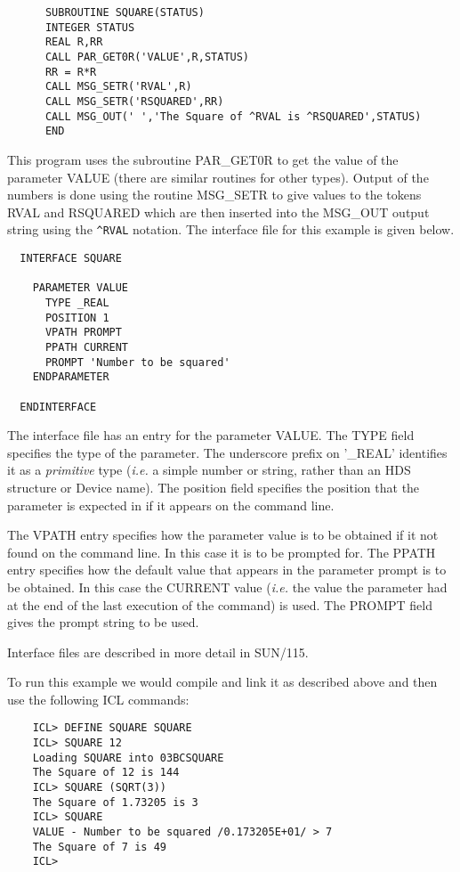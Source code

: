 \documentclass[twoside,11pt]{report}
\begin{document}
\begin{verbatim}
      SUBROUTINE SQUARE(STATUS)
      INTEGER STATUS
      REAL R,RR
      CALL PAR_GET0R('VALUE',R,STATUS)
      RR = R*R
      CALL MSG_SETR('RVAL',R)
      CALL MSG_SETR('RSQUARED',RR)
      CALL MSG_OUT(' ','The Square of ^RVAL is ^RSQUARED',STATUS)
      END
\end{verbatim}

This program uses the subroutine PAR\_GET0R to get the value of the parameter
VALUE (there are similar routines for other types). Output of the numbers
is done using the routine MSG\_SETR to give values to the tokens RVAL and
RSQUARED which are then inserted into the MSG\_OUT output string using
the \verb$^RVAL$ notation. The interface file for this example is given
below.

\begin{verbatim}
  INTERFACE SQUARE

    PARAMETER VALUE
      TYPE _REAL
      POSITION 1
      VPATH PROMPT
      PPATH CURRENT
      PROMPT 'Number to be squared'
    ENDPARAMETER

  ENDINTERFACE
\end{verbatim}

The interface file has an entry for the parameter VALUE. The TYPE field
specifies the type of the parameter. The underscore prefix on '\_REAL'
identifies it as a {\em primitive} type ({\em i.e.} a simple number or string,
rather than an HDS structure or Device name). The position field specifies
the position that the parameter is expected in if it appears on the command
line.

The VPATH entry specifies how the parameter value is to be obtained if it
not found on the command line. In this case it is to be prompted for. The
PPATH entry specifies how the default value that appears in the parameter
prompt is to be obtained. In this case the CURRENT value ({\em i.e.} the value
the parameter had at the end of the last execution of the command) is used.
The PROMPT field gives the prompt string to be used.

Interface files are described in more detail in SUN/115.

To run this example we would compile and link it as described above and
then use the following ICL commands:

\begin{verbatim}
    ICL> DEFINE SQUARE SQUARE
    ICL> SQUARE 12
    Loading SQUARE into 03BCSQUARE
    The Square of 12 is 144
    ICL> SQUARE (SQRT(3))
    The Square of 1.73205 is 3
    ICL> SQUARE
    VALUE - Number to be squared /0.173205E+01/ > 7
    The Square of 7 is 49
    ICL>
\end{verbatim}
\end{document}
